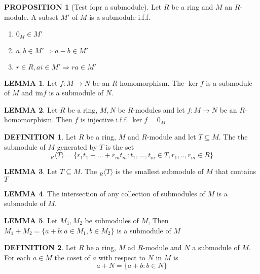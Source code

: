 \documentclass[12pt]{article}
\theoremstyle{definition}
\newtheorem{definition}{DEFINITION}[subsection]
\newcommand{\image}{\text{im}}
\newtheorem{lemma}{LEMMA}[subsection]
\newtheorem{prop}{PROPOSITION}[subsection]
\begin{document}
\begin{prop}[Test fopr a submodule]
    Let $R$ be a ring and $M$ an $R$-module. A subset $M'$ of $M$ is a submodule i.f.f.
    \begin{enumerate}
        \item $0_M \in M'$
        \item $a,b \in M' \Rightarrow a-b \in M'$
        \item $r \in R, a i\in M' \Rightarrow ra \in M'$
    \end{enumerate}
\end{prop}

\begin{lemma}
    Let $f: M \rightarrow N$ be an $R$-homomorphism. The $\ker f$ is a submodule of $M$ and $\image f$ is a submodule of $N$.
\end{lemma}

\begin{lemma}
    Let $R$ be a ring, $M,N$ be $R$-modules and let $f: M \rightarrow N$ be an $R$-homomorphism. Then $f$ is injective i.f.f. $\ker f = {0_M}$
\end{lemma}

\begin{definition}
    Let $R$ be a ring, $M$ and $R$-module and let $T \subseteq M$. The the submodule of $M$ generated by $T$ is the set
    $$_R\langle T \rangle = \{r_1t_1 + ... + r_mt_m:t_1,...,t_m \in T, r_1,..,r_m \in R\}$$
\end{definition}

\begin{lemma}
    Let $T\subseteq M$. The $_R\langle T\rangle$ is the smallest submodule of $M$ that contains $T$
\end{lemma}

\begin{lemma}
    The intersection of any collection of submodules of $M$ is a submodule of $M$.
\end{lemma}

\begin{lemma}
    Let $M_1, M_2$ be submodules of $M$, Then $M_1 + M_2 = \{a+b:a\in M_1, b\in M_2\}$ is a submodule of $M$
\end{lemma}

\begin{definition}
    Let $R$ be a ring, $M$ ad $R$-module and $N$ a submodule of $M$. For each $a \in M$ the coset of $a$ with respect to $N$ in $M$ is
    $$a+N = \{a+b:b\in N\}$$
\end{definition}
\end{document}

